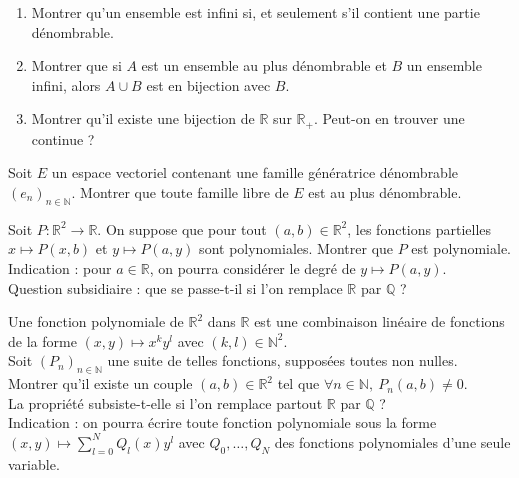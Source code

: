 \documentclass[french]{article}
\newcommand{\N}{\mathbb{N}}
\newcommand{\Q}{\mathbb{Q}}
\newcommand{\R}{\mathbb{R}}
\theoremstyle{plain}
\theoremstyle{definition}
\theoremstyle{remark}
\begin{document}
\begin{exo}
	\begin{enumerate}
		\item Montrer qu'un ensemble est infini si, et seulement s'il contient une partie dénombrable.
		\item Montrer que si $A$ est un ensemble au plus dénombrable et $B$ un ensemble infini, alors $A\cup B$ est en bijection avec $B$.
		\item Montrer qu'il existe une bijection de $\R$ sur $\R_+$. Peut-on en trouver une continue ?
	\end{enumerate}
\end{exo}

\begin{exo}
	Soit $E$ un espace vectoriel contenant une famille génératrice dénombrable $(e_n)_{n\in\N}$. Montrer que toute famille libre de $E$ est au plus dénombrable.
\end{exo}

\begin{exo}
	Soit $P:\R^2\to\R$. On suppose que pour tout $(a,b)\in\R^2$, les fonctions partielles $x\mapsto P(x,b)$ et $y\mapsto P(a,y)$ sont polynomiales. Montrer que $P$ est polynomiale. \\
	Indication : pour $a\in\R$, on pourra considérer le degré de $y\mapsto P(a,y)$. \\
	Question subsidiaire : que se passe-t-il si l'on remplace $\R$ par $\Q$ ?
\end{exo}

\begin{exo}
	Une fonction polynomiale de $\R^2$ dans $\R$ est une combinaison linéaire de fonctions de la forme $(x,y)\mapsto x^ky^l$ avec $(k,l)\in\N^2$.\\
	Soit $(P_n)_{n\in\N}$ une suite de telles fonctions, supposées toutes non nulles. Montrer qu'il existe un couple $(a,b)\in\R^2$ tel que $\forall n\in\N,\ P_n(a,b)\ne 0$.\\
	La propriété subsiste-t-elle si l'on remplace partout $\R$ par $\Q$ ? \\
	Indication : on pourra écrire toute fonction polynomiale sous la forme $(x,y)\mapsto\displaystyle\sum_{l=0}^{N}Q_l(x)y^l$ avec $Q_0,\ldots,Q_N$ des fonctions polynomiales d'une seule variable.
\end{exo}
\end{document}
